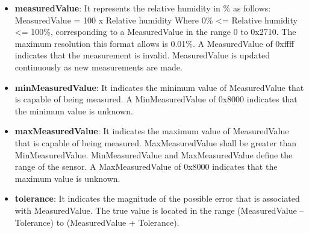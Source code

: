 \begin{itemize}
\item \textbf{measuredValue}: It represents the relative humidity in \% as follows: MeasuredValue = 100 x Relative humidity Where 0\% <= Relative humidity <= 100\%, corresponding to a MeasuredValue in the range 0 to 0x2710. The maximum resolution this format allows is 0.01\%. A MeasuredValue of 0xffff indicates that the measurement is invalid. MeasuredValue is updated continuously as new measurements are made.
\item \textbf{minMeasuredValue}: It indicates the minimum value of MeasuredValue that is capable of being measured. A MinMeasuredValue of 0x8000 indicates that the minimum value is unknown.
\item \textbf{maxMeasuredValue}: It indicates the maximum value of MeasuredValue that is capable of being measured. MaxMeasuredValue shall be greater than MinMeasuredValue. MinMeasuredValue and MaxMeasuredValue define the range of the sensor. A MaxMeasuredValue of 0x8000 indicates that the maximum value is unknown.
\item \textbf{tolerance}: It indicates the magnitude of the possible error that is associated with MeasuredValue. The true value is located in the range (MeasuredValue – Tolerance) to (MeasuredValue + Tolerance).
\end{itemize}

